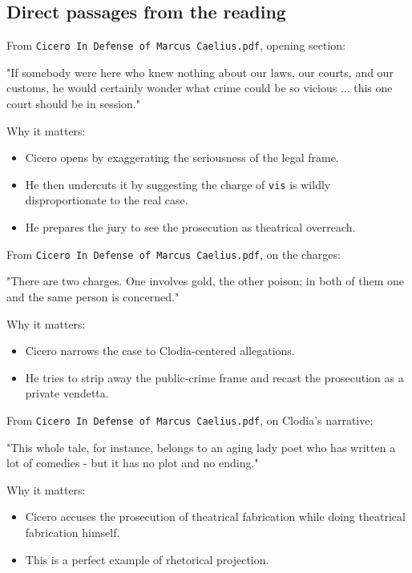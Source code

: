 \documentclass[11pt]{article}
\begin{document}
\subsection{Direct passages from the reading}

From \texttt{Cicero In Defense of Marcus Caelius.pdf}, opening section:

\begin{quotebox}
"If somebody were here who knew nothing about our laws, our courts, and our customs, he would certainly wonder what crime could be so vicious ... this one court should be in session."
\end{quotebox}

Why it matters:

\begin{itemize}
\item Cicero opens by exaggerating the seriousness of the legal frame.
\item He then undercuts it by suggesting the charge of \texttt{vis} is wildly disproportionate to the real case.
\item He prepares the jury to see the prosecution as theatrical overreach.
\end{itemize}

From \texttt{Cicero In Defense of Marcus Caelius.pdf}, on the charges:

\begin{quotebox}
"There are two charges. One involves gold, the other poison; in both of them one and the same person is concerned."
\end{quotebox}

Why it matters:

\begin{itemize}
\item Cicero narrows the case to Clodia-centered allegations.
\item He tries to strip away the public-crime frame and recast the prosecution as a private vendetta.
\end{itemize}

From \texttt{Cicero In Defense of Marcus Caelius.pdf}, on Clodia's narrative:

\begin{quotebox}
"This whole tale, for instance, belongs to an aging lady poet who has written a lot of comedies - but it has no plot and no ending."
\end{quotebox}

Why it matters:

\begin{itemize}
\item Cicero accuses the prosecution of theatrical fabrication while doing theatrical fabrication himself.
\item This is a perfect example of rhetorical projection.
\end{itemize}
\end{document}
